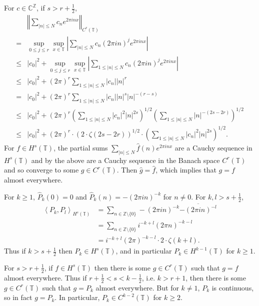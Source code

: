 \documentclass{article}
\newcommand{\inner}[2]{\left\langle #1, #2 \right\rangle}
\newcommand{\norm}[1]{\left\Vert #1 \right\Vert}
\theoremstyle{definition}
\theoremstyle{definition}
\begin{document}
For $c \in \mathbb{C}^\mathbb{Z}$, if  $s>r+\frac{1}{2}$,
\[
\begin{split}
&\norm{ \sum_{|n| \leq N} c_n e^{2\pi inx}}_{C^r(\mathbb{T})}\\
=&\sup_{0 \leq j \leq r} \sup_{x \in \mathbb{T}} \left| \sum_{|n| \leq N}  c_n (2\pi in)^j e^{2\pi inx}\right|\\
\leq& |c_0|^2+\sup_{0 \leq j \leq r} \sup_{x \in \mathbb{T}} \left| \sum_{1 \leq |n| \leq N}  c_n (2\pi in)^j e^{2\pi inx}\right|\\
\leq&|c_0|^2 + (2\pi)^r \sum_{1 \leq |n| \leq N} |c_n|  |n|^r\\
=&|c_0|^2 + (2\pi)^r \sum_{1 \leq |n| \leq N} |c_n| |n|^s  |n|^{-(r-s)}\\
\leq&|c_0|^2 + (2\pi)^r \left( \sum_{1 \leq |n| \leq N} |c_n|^2 |n|^{2s}\right)^{1/2}
\left( \sum_{1 \leq |n| \leq N} |n|^{-(2s-2r)} \right)^{1/2}\\
\leq&|c_0|^2  + (2\pi)^r \cdot (2\cdot \zeta(2s-2r))^{1/2} \cdot \left( \sum_{1 \leq |n| \leq N} |c_n|^2 |n|^{2s}\right)^{1/2}.
\end{split}
\]
For $f \in H^s(\mathbb{T})$, the partial sums $\sum_{|n| \leq N} \widehat{f}(n) e^{2\pi inx}$ are a Cauchy sequence in $H^s(\mathbb{T})$
and by the above are a Cauchy sequence in the Banach space $C^r(\mathbb{T})$ and so converge to some $g \in C^r(\mathbb{T})$.
Then $\widehat{g} = \widehat{f}$, which implies that $g=f$ almost everywhere.

For $k \geq 1$, $\widehat{P}_k(0) = 0$ and $\widehat{P}_k(n) = -(2\pi in)^{-k}$ for $n \neq 0$. For $k,l > s + \frac{1}{2}$,
\begin{align*}
\inner{P_k}{P_l}_{H^s(\mathbb{T})}&=\sum_{n \in \mathbb{Z} \setminus \{0\}} -(2\pi in)^{-k} \overline{-(2\pi in)^{-l}}\\
&=\sum_{n \in \mathbb{Z} \setminus \{0\}} i^{-k+l} (2\pi n)^{-k-l}\\
&=i^{-k+l} (2\pi)^{-k-l} \cdot 2 \cdot \zeta(k+l).
\end{align*}
Thus if $k>s+\frac{1}{2}$ then $P_k \in H^s(\mathbb{T})$, and in particular
$P_k \in H^{k-1}(\mathbb{T})$ for $k \geq 1$.

For $s>r+\frac{1}{2}$, if $f \in H^s(\mathbb{T})$ then there is some $g \in C^r(\mathbb{T})$ such that $g=f$ almost everywhere.
Thus if $r+\frac{1}{2}<s<k-\frac{1}{2}$, i.e. $k>r+1$, then there is some $g \in C^r(\mathbb{T})$ such that $g=P_k$ almost everywhere. But
for $k \neq 1$, $P_k$ is continuous, so in fact $g=P_k$.  In particular,
$P_k \in C^{k-2}(\mathbb{T})$ for $k \geq 2$.
\end{document}
